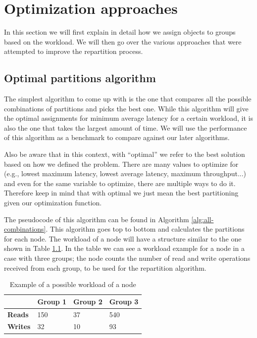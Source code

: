 \chapter{Optimization approaches}\label{sec:optimization-approaches}
In this section we will first explain in detail how we assign objects to groups based on the workload. We will then go over the various approaches that were attempted to improve the repartition process. 

\section{Optimal partitions algorithm}\label{sec:optimal-partitions-algorithm} 
The simplest algorithm to come up with is the one that compares all the possible combinations of partitions and picks the best one. While this algorithm will give the optimal assignments for minimum average latency for a certain workload, it is also the one that takes the largest amount of time. We will use the performance of this algorithm as a benchmark to compare against our later algorithms.

Also be aware that in this context, with ``optimal'' we refer to the best solution based on how we defined the problem. There are many values to optimize for (e.g., lowest maximum latency, lowest average latency, maximum throughput...) and even for the same variable to optimize, there are multiple ways to do it. Therefore keep in mind that with optimal we just mean the best partitioning given our optimization function.

The pseudocode of this algorithm can be found in Algorithm \ref{alg:all-combinations}. This algorithm goes top to bottom and  calculates the partitions for each node. The workload of a node will have a structure similar to the one shown in Table \ref{tab:workload-example}. In the table we can see a workload example for a node in a case with three groups; the node counts the number of read and write operations received from each group, to be used for the repartition algorithm.

\begin{table}[!htb]
  \centering
  \begin{tabular}{l l l l}
    \hline
    & \textbf{Group 1} & \textbf{Group 2} & \textbf{Group 3} \\
    \hline
    \textbf{Reads} & 150 & 37 & 540 \\
    \textbf{Writes} & 32 & 10 & 93 \\
    \hline
  \end{tabular}
  \caption{Example of a possible workload of a node}\label{tab:workload-example}
\end{table}

